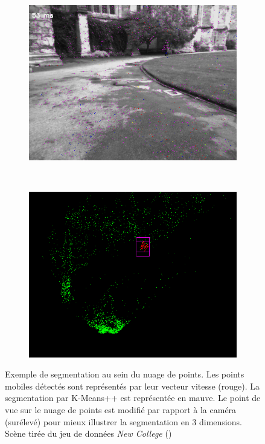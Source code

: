\begin{figure}[h]
	\begin{center}
		\begin{subfigure}[t]{0.48\textwidth}
			\includegraphics[width=\textwidth]{Chapter5/graphics/k_means_pp_screen_pict.png} 
		\end{subfigure}	
		~
		\begin{subfigure}[t]{0.48\textwidth}
			\includegraphics[width=\textwidth]{Chapter5/graphics/k_means_pp_screen_pcloud.png} 
		\end{subfigure}	
		
		\caption{Exemple de segmentation au sein du nuage de points. Les points mobiles détectés sont représentés par leur vecteur vitesse (rouge). La segmentation par K-Means++ est représentée en mauve. Le point de vue sur le nuage de points est modifié par rapport à la caméra (surélevé) pour mieux illustrer la segmentation en 3 dimensions. Scène tirée du jeu de données \emph{New College} (\cite{Smith2009}) }
		\label{fig:ch5_kmeans_exempleD}
	\end{center}
\end{figure}

